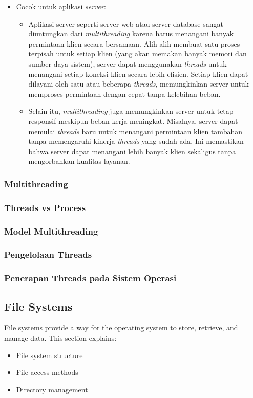 \documentclass[12pt]{article}
\begin{document}
\begin{itemize}
    \item Cocok untuk aplikasi \textit{server}:
    \begin{itemize}
        \item Aplikasi server seperti server web atau server database sangat diuntungkan dari \textit{multithreading} karena harus menangani banyak permintaan klien secara bersamaan. Alih-alih membuat satu proses terpisah untuk setiap klien (yang akan memakan banyak memori dan sumber daya sistem), server dapat menggunakan \textit{threads} untuk menangani setiap koneksi klien secara lebih efisien. Setiap klien dapat dilayani oleh satu atau beberapa \textit{threads}, memungkinkan server untuk memproses permintaan dengan cepat tanpa kelebihan beban.
        \item Selain itu, \textit{multithreading} juga memungkinkan server untuk tetap responsif meskipun beban kerja meningkat. Misalnya, server dapat memulai \textit{threads} baru untuk menangani permintaan klien tambahan tanpa memengaruhi kinerja \textit{threads} yang sudah ada. Ini memastikan bahwa server dapat menangani lebih banyak klien sekaligus tanpa mengorbankan kualitas layanan.
    \end{itemize}
\end{itemize}

\subsubsection{Multithreading}
\subsubsection{Threads vs Process}
\subsubsection{Model Multithreading}
\subsubsection{Pengelolaan Threads}
\subsubsection{Penerapan Threads pada Sistem Operasi}


\subsection{File Systems}
File systems provide a way for the operating system to store, retrieve, and manage data. This section explains:
\begin{itemize}
    \item File system structure
    \item File access methods
    \item Directory management
\end{itemize}
\end{document}

